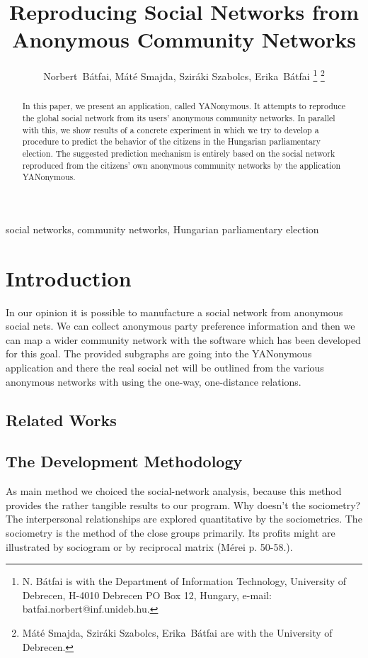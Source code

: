 \documentclass[journal]{IEEEtran}
\begin{document}
\title{Reproducing Social Networks from Anonymous Community Networks}

\author{Norbert~B\'atfai, 
M\'at\'e Smajda,
Szir\'aki Szabolcs,
Erika~B\'atfai%
\thanks{N. B\'atfai is with the Department of Information Technology, University of Debrecen,
H-4010 Debrecen PO Box 12, Hungary, e-mail: batfai.norbert@inf.unideb.hu.}
\thanks{M\'at\'e Smajda,
Szir\'aki Szabolcs,
Erika~B\'atfai
are with the University of Debrecen.}
}

\maketitle

\begin{abstract}
In this paper, we present an application, called YANonymous. It attempts to reproduce the global social network from its users' anonymous community networks. In parallel with this, we show results of a concrete experiment in which we try to develop a procedure to predict the behavior of the citizens in the Hungarian parliamentary election. The suggested prediction mechanism is entirely based on the social network reproduced  from the citizens' own anonymous community networks by the application YANonymous.
\end{abstract}

\begin{IEEEkeywords}
social networks, community networks, Hungarian parliamentary election
\end{IEEEkeywords}

\section{Introduction}
In our opinion it is possible to manufacture a social network from anonymous social nets. We can collect anonymous party preference information and then we can map a wider community network with the software which has been developed for this goal. The provided subgraphs are going into the YANonymous application and there the real social net will be outlined from the various anonymous networks with using the one-way, one-distance relations.

\subsection{Related Works}



\subsection{The Development Methodology}
As main method we choiced the social-network analysis, because this method provides the rather tangible results to our program. 
Why doesn’t the sociometry? The interpersonal relationships are explored quantitative by the sociometrics. The sociometry is the method of the close groups primarily. Its profits might are illustrated by sociogram or by reciprocal matrix (Mérei p. 50-58.).
\end{document}
